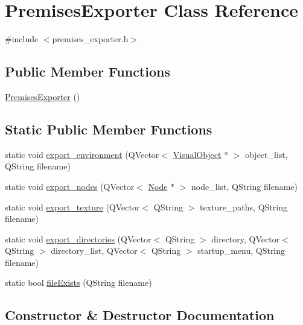 \hypertarget{class_premises_exporter}{}\section{Premises\+Exporter Class Reference}
\label{class_premises_exporter}


{\ttfamily \#include $<$premises\+\_\+exporter.\+h$>$}

\subsection*{Public Member Functions}
\begin{DoxyCompactItemize}
\item 
\hyperlink{class_premises_exporter_abad8d1f7009d4de0562cc7a13dd4012c}{Premises\+Exporter} ()
\end{DoxyCompactItemize}
\subsection*{Static Public Member Functions}
\begin{DoxyCompactItemize}
\item 
static void \hyperlink{class_premises_exporter_a9c5656f120f4c61c70ae78770c222125}{export\+\_\+environment} (Q\+Vector$<$ \hyperlink{class_visual_object}{Visual\+Object} $\ast$ $>$ object\+\_\+list, Q\+String filename)
\item 
static void \hyperlink{class_premises_exporter_a6ba0331fd6136c8761520a1c64e01377}{export\+\_\+nodes} (Q\+Vector$<$ \hyperlink{class_node}{Node} $\ast$ $>$ node\+\_\+list, Q\+String filename)
\item 
static void \hyperlink{class_premises_exporter_a9b8a61c7ff275793ba3aa0575df58f2e}{export\+\_\+texture} (Q\+Vector$<$ Q\+String $>$ texture\+\_\+paths, Q\+String filename)
\item 
static void \hyperlink{class_premises_exporter_af3f645f9cce682ce296a79ee11f8e2c2}{export\+\_\+directories} (Q\+Vector$<$ Q\+String $>$ directory, Q\+Vector$<$ Q\+String $>$ directory\+\_\+list, Q\+Vector$<$ Q\+String $>$ startup\+\_\+menu, Q\+String filename)
\item 
static bool \hyperlink{class_premises_exporter_a88ee589b81442cd3896a3fb476221057}{file\+Exists} (Q\+String filename)
\end{DoxyCompactItemize}


\subsection{Constructor \& Destructor Documentation}
\hypertarget{class_premises_exporter_abad8d1f7009d4de0562cc7a13dd4012c}{}
